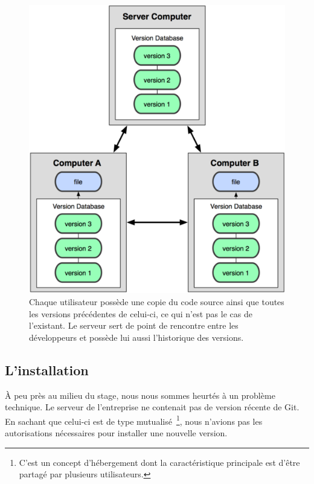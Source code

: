 \begin{figure}
  \begin{center}
    \includegraphics[scale=0.7]{images/workflow.png}
    \caption{ Chaque utilisateur possède une copie du code source
    ainsi que toutes les versions précédentes de celui-ci, ce qui n'est pas
    le cas de l'existant. Le serveur sert de point de rencontre entre les
    développeurs et possède lui aussi l’historique des versions.}
    \label{flow}
  \end{center}
\end{figure}

\subsection{L'installation} %
\label{sub:L'installation}

À peu près au milieu du stage, nous nous sommes heurtés à un problème
technique. Le serveur de l'entreprise ne contenait pas de version
récente de Git. En sachant que celui-ci est de type mutualisé\,
\footnote{C'est un concept d'hébergement dont la caractéristique
principale est d'être partagé par plusieurs utilisateurs.}, nous
n'avions pas les autorisations nécessaires pour installer une nouvelle
version.

